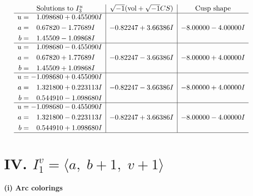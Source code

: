 \documentclass[1p]{elsarticle_modified}
\theoremstyle{definition}
\newcommand{\I}{\sqrt{-1}}
\begin{document}
$$\begin{array}{c|c|c}  
\text{Solutions to }I^u_{3}& \I (\text{vol} + \sqrt{-1}CS) & \text{Cusp shape}\\
 \hline 
\begin{aligned}
u &= \phantom{-}1.098680 + 0.455090 I \\
a &= \phantom{-}0.67820 - 1.77689 I \\
b &= \phantom{-}1.45509 - 1.09868 I\end{aligned}
 & -0.82247 + 3.66386 I & -8.00000 - 4.00000 I \\ \hline\begin{aligned}
u &= \phantom{-}1.098680 - 0.455090 I \\
a &= \phantom{-}0.67820 + 1.77689 I \\
b &= \phantom{-}1.45509 + 1.09868 I\end{aligned}
 & -0.82247 - 3.66386 I & -8.00000 + 4.00000 I \\ \hline\begin{aligned}
u &= -1.098680 + 0.455090 I \\
a &= \phantom{-}1.321800 + 0.223113 I \\
b &= \phantom{-}0.544910 - 1.098680 I\end{aligned}
 & -0.82247 - 3.66386 I & -8.00000 + 4.00000 I \\ \hline\begin{aligned}
u &= -1.098680 - 0.455090 I \\
a &= \phantom{-}1.321800 - 0.223113 I \\
b &= \phantom{-}0.544910 + 1.098680 I\end{aligned}
 & -0.82247 + 3.66386 I & -8.00000 - 4.00000 I\\
 \hline 
 \end{array}$$\newpage\newpage\renewcommand{\arraystretch}{1}
\centering \section*{IV. $I^v_{1}= \langle a,\;b+1,\;v+1 \rangle$}
\flushleft \textbf{(i) Arc colorings}\\
\end{document}
